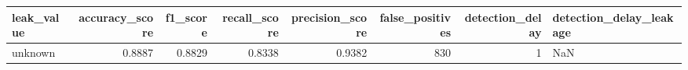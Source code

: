 \begin{tabular}{lrrrrrrl}
\toprule
leak\_value & accuracy\_score & f1\_score & recall\_score & precision\_score & false\_positives & detection\_delay & detection\_delay\_leakage \\
\midrule
unknown & 0.8887 & 0.8829 & 0.8338 & 0.9382 & 830 & 1 & NaN \\
\bottomrule
\end{tabular}
